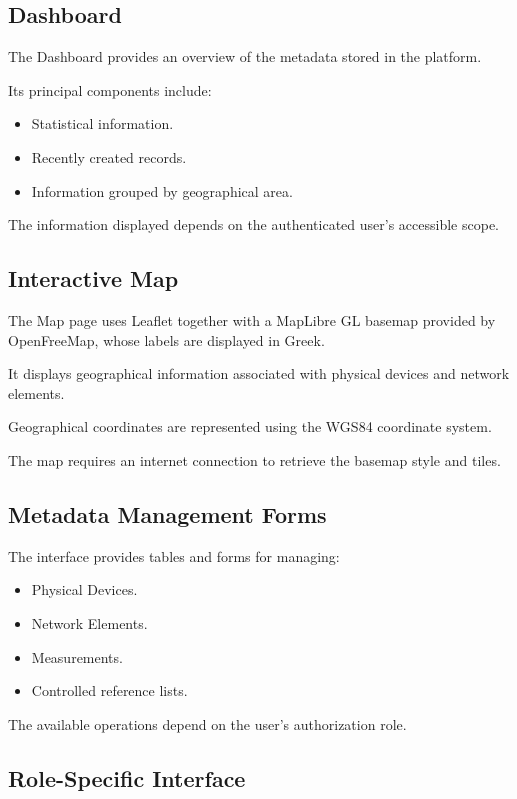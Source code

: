 \documentclass[11pt,a4paper]{article}
\begin{document}
\subsection{Dashboard}

The Dashboard provides an overview
of the metadata stored in the platform.

Its principal components include:

\begin{itemize}
    \item Statistical information.
    \item Recently created records.
    \item Information grouped by geographical area.
\end{itemize}

The information displayed depends on
the authenticated user's accessible scope.

\subsection{Interactive Map}

The Map page uses Leaflet together with a
MapLibre GL basemap provided by OpenFreeMap,
whose labels are displayed in Greek.

It displays geographical information
associated with physical devices
and network elements.

Geographical coordinates are represented
using the WGS84 coordinate system.

The map requires an internet connection
to retrieve the basemap style and tiles.

\subsection{Metadata Management Forms}

The interface provides tables and forms
for managing:

\begin{itemize}
    \item Physical Devices.
    \item Network Elements.
    \item Measurements.
    \item Controlled reference lists.
\end{itemize}

The available operations depend on
the user's authorization role.

\subsection{Role-Specific Interface}
\end{document}
